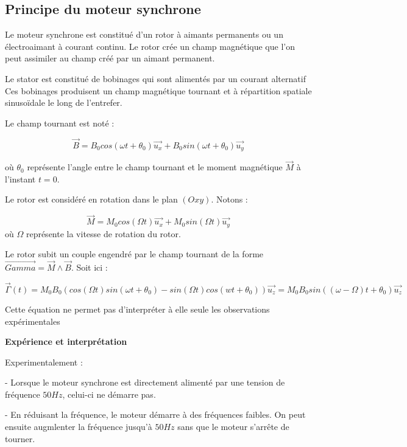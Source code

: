 \documentclass{article}
\begin{document}
\subsection{Principe du moteur synchrone}

Le moteur synchrone est constitué d'un rotor à aimants permanents ou un électroaimant à courant continu. Le rotor crée un champ magnétique que l'on peut assimiler au champ créé par un aimant permanent.\medskip

Le stator est constitué de bobinages qui sont alimentés par un courant alternatif Ces bobinages produisent un champ magnétique tournant et à répartition spatiale sinusoïdale le long de l'entrefer.\medskip

Le champ tournant est noté :

\begin{equation}
    \vec{B} = B_0 cos(\omega t + \theta_0)\vec{u_x} + B_0 sin(\omega t + \theta_0)\vec{u_y}
\end{equation}

où $\theta_0$ représente l'angle entre le champ tournant et le moment magnétique $\vec{M}$ à l'instant $t=0$.\medskip

Le rotor est considéré en rotation dans le plan $(Oxy)$. Notons :

\begin{equation}
    \vec{M} = M_0 cos(\Omega t) \vec{u_x} + M_0sin(\Omega t )\vec{u_y}
\end{equation}
où $\Omega$ représente la vitesse de rotation du rotor.\medskip

Le rotor subit un couple engendré par le champ tournant de la forme $\vec{Gamma} = \vec{M} \land \vec{B}$. Soit ici :

\begin{equation}
    \vec{\Gamma} (t) = M_0 B_0 (cos(\Omega t)sin(\omega t + \theta_0) - sin(\Omega t)cos(wt+\theta_0)) \vec{u_z} = M_0 B_0 sin ((\omega - \Omega)t + \theta_0) \vec{u_z}
\end{equation}

Cette équation ne permet pas d'interpréter à elle seule les observations expérimentales

\textbf{Expérience et interprétation}\medskip

Experimentalement :\medskip

- Lorsque le moteur synchrone est directement alimenté par une tension de fréquence $50 Hz$, celui-ci ne démarre pas.\medskip

- En réduisant la fréquence, le moteur démarre à des fréquences faibles. On peut ensuite augmlenter la fréquence jusqu'à $50 Hz$ sans que le moteur s'arrête de tourner.\medskip
\end{document}
